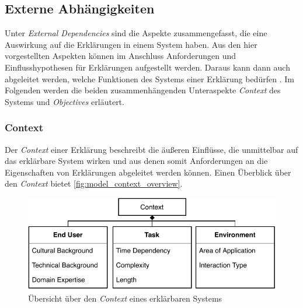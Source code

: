 \subsection{Externe Abhängigkeiten}
\label{sec:model_external_dependencies}

Unter \textit{External Dependencies} sind die Aspekte zusammengefasst, die eine Auswirkung auf die Erklärungen in einem System haben. Aus den hier vorgestellten Aspekten können im Anschluss Anforderungen und Einflusshypothesen für Erklärungen aufgestellt werden. Daraus kann dann auch abgeleitet werden, welche Funktionen des Systems einer Erklärung bedürfen \cite{kohl_explainability_2019}. Im Folgenden werden die beiden zusammenhängenden Unteraspekte \textit{Context} des Systems und \textit{Objectives} erläutert.

\subsubsection{Context}

Der \textit{Context} einer Erklärung beschreibt die äußeren Einflüsse, die unmittelbar auf das erklärbare System wirken und aus denen somit Anforderungen an die Eigenschaften von Erklärungen abgeleitet werden können. Einen Überblick über den \textit{Context} bietet \autoref{fig:model_context_overview}.

\begin{figure}[htb!]
    \begin{center}
        \includegraphics{contents/05_model_description/res/model_context_overview.pdf}
    \end{center}
    \caption{Übersicht über den \textit{Context} eines erklärbaren Systems}
    \label{fig:model_context_overview}
\end{figure}

